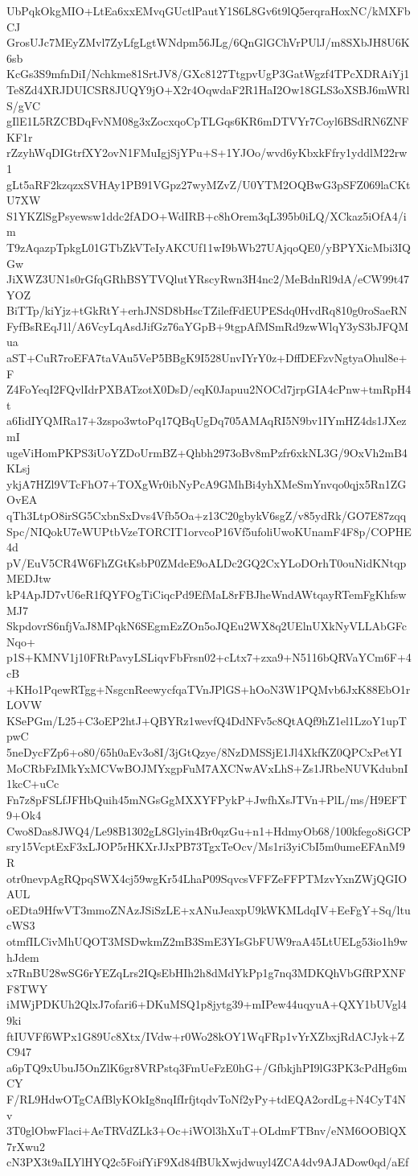 UbPqkOkgMIO+LtEa6xxEMvqGUctlPautY1S6L8Gv6t9lQ5erqraHoxNC/kMXFbCJ
GrosUJc7MEyZMvl7ZyLfgLgtWNdpm56JLg/6QnGlGChVrPUlJ/m8SXbJH8U6K6sb
KcGs3S9mfnDiI/Nchkme81SrtJV8/GXc8127TtgpvUgP3GatWgzf4TPcXDRAiYj1
Te8Zd4XRJDUICSR8JUQY9jO+X2r4OqwdaF2R1HaI2Ow18GLS3oXSBJ6mWRlS/gVC
gIlE1L5RZCBDqFvNM08g3xZocxqoCpTLGqs6KR6mDTVYr7Coyl6BSdRN6ZNFKF1r
rZzyhWqDIGtrfXY2ovN1FMuIgjSjYPu+S+1YJOo/wvd6yKbxkFfry1yddlM22rw1
gLt5aRF2kzqzxSVHAy1PB91VGpz27wyMZvZ/U0YTM2OQBwG3pSFZ069laCKtU7XW
S1YKZlSgPsyewsw1ddc2fADO+WdIRB+c8hOrem3qL395b0iLQ/XCkaz5iOfA4/im
T9zAqazpTpkgL01GTbZkVTeIyAKCUf11wI9bWb27UAjqoQE0/yBPYXicMbi3IQGw
JiXWZ3UN1s0rGfqGRhBSYTVQlutYRscyRwn3H4nc2/MeBdnRl9dA/eCW99t47YOZ
BiTTp/kiYjz+tGkRtY+erhJNSD8bHscTZilefFdEUPESdq0HvdRq810g0roSaeRN
FyfBsREqJ1l/A6VcyLqAsdJifGz76aYGpB+9tgpAfMSmRd9zwWlqY3yS3bJFQMua
aST+CuR7roEFA7taVAu5VeP5BBgK9I528UnvIYrY0z+DffDEFzvNgtyaOhul8e+F
Z4FoYeqI2FQvlIdrPXBATzotX0DsD/eqK0Japuu2NOCd7jrpGIA4cPnw+tmRpH4t
a6IidIYQMRa17+3zspo3wtoPq17QBqUgDq705AMAqRI5N9bv1IYmHZ4ds1JXezmI
ugeViHomPKPS3iUoYZDoUrmBZ+Qhbh2973oBv8mPzfr6xkNL3G/9OxVh2mB4KLsj
ykjA7HZl9VTcFhO7+TOXgWr0ibNyPcA9GMhBi4yhXMeSmYnvqo0qjx5Rn1ZGOvEA
qTh3LtpO8irSG5CxbnSxDvs4Vfb5Oa+z13C20gbykV6sgZ/v85ydRk/GO7E87zqq
Spc/NIQokU7eWUPtbVzeTORCIT1orvcoP16Vf5ufoliUwoKUnamF4F8p/COPHE4d
pV/EuV5CR4W6FhZGtKsbP0ZMdeE9oALDc2GQ2CxYLoDOrhT0ouNidKNtqpMEDJtw
kP4ApJD7vU6eR1fQYFOgTiCiqcPd9EfMaL8rFBJheWndAWtqayRTemFgKhfswMJ7
SkpdovrS6nfjVaJ8MPqkN6SEgmEzZOn5oJQEu2WX8q2UElnUXkNyVLLAbGFcNqo+
p1S+KMNV1j10FRtPavyLSLiqvFbFrsn02+cLtx7+zxa9+N5116bQRVaYCm6F+4cB
+KHo1PqewRTgg+NsgcnReewycfqaTVnJPlGS+hOoN3W1PQMvb6JxK88EbO1rLOVW
KSePGm/L25+C3oEP2htJ+QBYRz1wevfQ4DdNFv5c8QtAQf9hZ1el1LzoY1upTpwC
5neDycFZp6+o80/65h0aEv3o8I/3jGtQzye/8NzDMSSjE1Jl4XkfKZ0QPCxPetYI
MoCRbFzIMkYxMCVwBOJMYxgpFuM7AXCNwAVxLhS+Zs1JRbeNUVKdubnI1kcC+uCc
Fn7z8pFSLfJFHbQuih45mNGsGgMXXYFPykP+JwfhXsJTVn+PlL/ms/H9EFT9+Ok4
Cwo8Das8JWQ4/Le98B1302gL8Glyin4Br0qzGu+n1+HdmyOb68/100kfego8iGCP
sry15VcptExF3xLJOP5rHKXrJJxPB73TgxTeOcv/Ms1ri3yiCbI5m0umeEFAnM9R
otr0nevpAgRQpqSWX4cj59wgKr54LhaP09SqvcsVFFZeFFPTMzvYxnZWjQGIOAUL
oEDta9HfwVT3mmoZNAzJSiSzLE+xANuJeaxpU9kWKMLdqIV+EeFgY+Sq/ltucWS3
otmfILCivMhUQOT3MSDwkmZ2mB3SmE3YIsGbFUW9raA45LtUELg53io1h9whJdem
x7RnBU28wSG6rYEZqLrs2IQsEbHIh2h8dMdYkPp1g7nq3MDKQhVbGfRPXNFF8TWY
iMWjPDKUh2QlxJ7ofari6+DKuMSQ1p8jytg39+mIPew44uqyuA+QXY1bUVgl49ki
ftIUVFf6WPx1G89Uc8Xtx/IVdw+r0Wo28kOY1WqFRp1vYrXZbxjRdACJyk+ZC947
a6pTQ9xUbuJ5OnZlK6gr8VRPstq3FmUeFzE0hG+/GfbkjhPI9lG3PK3cPdHg6mCY
F/RL9HdwOTgCAfBlyKOkIg8nqIfIrfjtqdvToNf2yPy+tdEQA2ordLg+N4CyT4Nv
3T0glObwFlaci+AeTRVdZLk3+Oc+iWOl3hXuT+OLdmFTBnv/eNM6OOBlQX7rXwu2
cN3PX3t9aILYlHYQ2c5FoifYiF9Xd84fBUkXwjdwuyl4ZCA4dv9AJADow0qd/aEf
